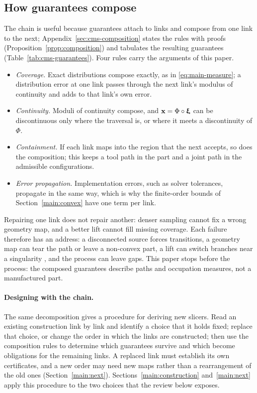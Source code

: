 \subsection{How guarantees compose}
\label{main:compose}
The chain is useful because guarantees attach to links and compose from one link to the next; Appendix~\ref{sec:cms-composition} states the rules with proofs (Proposition~\ref{prop:composition}) and tabulates the resulting guarantees (Table~\ref{tab:cms-guarantees}). Four rules carry the arguments of this paper.
\begin{itemize}
  \item \emph{Coverage.} Exact distributions compose exactly, as in \eqref{eq:main-measure}; a distribution error at one link passes through the next link's modulus of continuity and adds to that link's own error.
  \item \emph{Continuity.} Moduli of continuity compose, and ${\bm{\mathrm{x}}}=\Phi\circ{\bm{\mathrm{\upxi}}}$ can be discontinuous only where the traversal is, or where it meets a discontinuity of $\Phi$.
  \item \emph{Containment.} If each link maps into the region that the next accepts, so does the composition; this keeps a tool path in the part and a joint path in the admissible configurations.
  \item \emph{Error propagation.} Implementation errors, such as solver tolerances, propagate in the same way, which is why the finite-order bounds of Section~\ref{main:convex} have one term per link.
\end{itemize}
Repairing one link does not repair another: denser sampling cannot fix a wrong geometry map, and a better lift cannot fill missing coverage. Each failure therefore has an address: a disconnected source forces transitions, a geometry map can tear the path or leave a non-convex part, a lift can switch branches near a singularity \cite{zhang2021singularity}, and the process can leave gaps. This paper stops before the process: the composed guarantees describe paths and occupation measures, not a manufactured part.

\paragraph{Designing with the chain.}
The same decomposition gives a procedure for deriving new slicers. Read an existing construction link by link and identify a choice that it holds fixed; replace that choice, or change the order in which the links are constructed; then use the composition rules to determine which guarantees survive and which become obligations for the remaining links. A replaced link must establish its own certificates, and a new order may need new maps rather than a rearrangement of the old ones (Section~\ref{main:next}). Sections~\ref{main:construction} and~\ref{main:next} apply this procedure to the two choices that the review below exposes.

